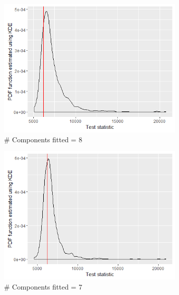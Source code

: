 \begin{figure}[!htb]
\centering
\captionsetup{justification=centering}
\begin{subfigure}[b]{0.4\textwidth}
		\includegraphics[width=\textwidth]{mainmatter/chapter_5_simulation_study/ppc_5wellsep8comp.png}
        \caption{\label{fig : ppc_5wellsep8comp} \# Components fitted = 8}
	\end{subfigure}
	\begin{subfigure}[b]{0.4\textwidth}
		\includegraphics[width=\textwidth]{mainmatter/chapter_5_simulation_study/ppc_5wellsep7comp.png}
          \caption{\label{fig : ppc_5wellsep7comp}\# Components fitted = 7}
	\end{subfigure}
	\begin{subfigure}[b]{0.4\textwidth}

\end{subfigure}
\end{figure}
